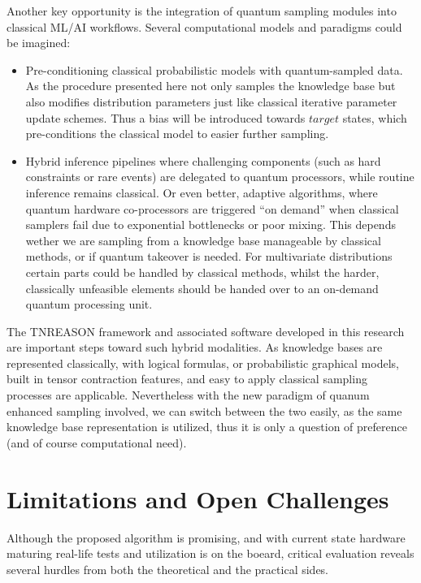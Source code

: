 \documentclass[encoding=utf8,british]{tumphthesis}
\begin{document}
        Another key opportunity is the integration of quantum sampling modules into classical ML/AI workflows. Several computational models and paradigms could be imagined:
        \begin{itemize}
            \item Pre-conditioning classical probabilistic models with quantum-sampled data. As the procedure presented here not only samples the knowledge base but also modifies distribution parameters 
            just like classical iterative parameter update schemes. Thus a bias will be introduced towards $target$ states, which pre-conditions the classical model to easier further sampling.
            \item Hybrid inference pipelines where challenging components (such as hard constraints or rare events) are delegated to quantum processors, while routine inference remains classical.
            Or even better, adaptive algorithms, where quantum hardware co-processors are triggered “on demand” when classical samplers fail due to exponential bottlenecks or poor mixing.
            This depends wether we are sampling from a knowledge base manageable by classical methods, or if quantum takeover is needed. For multivariate distributions certain parts could be 
            handled by classical methods, whilst the harder, classically unfeasible elements should be handed over to an on-demand quantum processing unit.
        \end{itemize}
        The TNREASON framework and associated software developed in this research are important steps toward such hybrid modalities. As knowledge bases are represented classically, with logical formulas,
        or probabilistic graphical models, built in tensor contraction features, and easy to apply classical sampling processes are applicable. Nevertheless with the new paradigm of quanum enhanced sampling involved,
        we can switch between the two easily, as the same knowledge base representation is utilized, thus it is only a question of preference (and of course computational need).

    \section{Limitations and Open Challenges}
    Although the proposed algorithm is promising, and with current state hardware maturing real-life tests and utilization is on the boeard, critical evaluation reveals several hurdles from both the theoretical
    and the practical sides.
\end{document}
